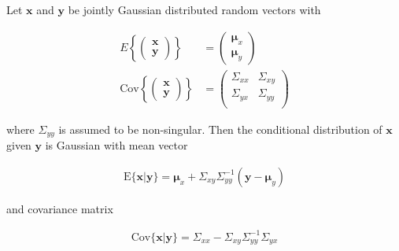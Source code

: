 \begin{lemma}

    Let $\mathbf{x}$ and $\mathbf{y}$ be jointly Gaussian distributed random
    vectors with

    \begin{align}
        E\left\{\left(\begin{array}{c}
                          \mathbf{x}\\
                          \mathbf{y}
                      \end{array}\right)\right\}&=\left(\begin{array}{c}
                                                           \boldsymbol{\mu}_x\\
                                                           \boldsymbol{\mu}_y
                                                       \end{array}\right)\label{eq:conditionaMean}\\
        \text{Cov}\left\{\left(\begin{array}{c}
                                   \mathbf{x}\\
                                   \mathbf{y}
                               \end{array}\right)\right\}&=\left(\begin{array}{cc}
                                                                     \Sigma_{xx} & \Sigma_{xy} \\
                                                                     \Sigma_{yx} & \Sigma_{yy} \\
                                                                  \end{array}\right)\label{eq:conditionalCov}
    \end{align}

    \noindent where $\Sigma_{yy}$ is assumed to be non-singular.
    Then the conditional distribution of $\mathbf{x}$ given $\mathbf{y}$ is
    Gaussian with mean vector

    \begin{align*}
        \text{E}\{\mathbf{x}|\mathbf{y}\}=\boldsymbol{\mu}_x+\Sigma_{xy}\Sigma_{yy}^{-1}(\mathbf{y}-\boldsymbol{\mu}_y)
    \end{align*}

    \noindent and covariance matrix

    \begin{align*}
        \text{Cov}\{\mathbf{x}|\mathbf{y}\}=\Sigma_{xx}-\Sigma_{xy}\Sigma_{yy}^{-1}\Sigma_{yx}
    \end{align*}

    \label{lemma:conditionalGaussians}

\end{lemma}

